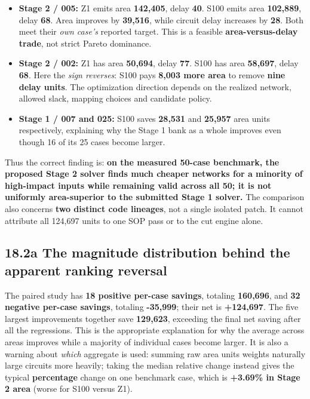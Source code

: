 \documentclass[a4paper,10pt]{article}
\providecommand{\tightlist}{\setlength{\itemsep}{0pt}\setlength{\parskip}{0pt}}
\theoremstyle{definition}
\theoremstyle{remark}
\begin{document}
\begin{itemize}
\tightlist
\item
  \textbf{Stage 2 / 005:} Z1 emits area \textbf{142,405}, delay \textbf{40}. S100 emits area \textbf{102,889}, delay \textbf{68}. Area improves by \textbf{39,516}, while circuit delay increases by \textbf{28}. Both meet their \emph{own case's} reported target. This is a feasible \textbf{area-versus-delay trade}, not strict Pareto dominance.
\item
  \textbf{Stage 2 / 002:} Z1 has area \textbf{50,694}, delay \textbf{77}. S100 has area \textbf{58,697}, delay \textbf{68}. Here the \emph{sign reverses}: S100 pays \textbf{8,003 more area} to remove \textbf{nine delay units}. The optimization direction depends on the realized network, allowed slack, mapping choices and candidate policy.
\item
  \textbf{Stage 1 / 007 and 025:} S100 saves \textbf{28,531} and \textbf{25,957} area units respectively, explaining why the Stage 1 bank as a whole improves even though 16 of its 25 cases become larger.
\end{itemize}

Thus the correct finding is: \textbf{on the measured 50-case benchmark, the proposed Stage 2 solver finds much cheaper networks for a minority of high-impact inputs while remaining valid across all 50; it is not uniformly area-superior to the submitted Stage 1 solver.} The comparison also concerns \textbf{two distinct code lineages}, not a single isolated patch. It cannot attribute all 124,697 units to one SOP pass or to the cut engine alone.

\subsection{18.2a The magnitude distribution behind the apparent ranking reversal}\label{a-the-magnitude-distribution-behind-the-apparent-ranking-reversal}

The paired study has \textbf{18 positive per-case savings}, totaling \textbf{160,696}, and \textbf{32 negative per-case savings}, totaling \textbf{-35,999}; their net is \textbf{+124,697}. The five largest improvements together save \textbf{129,623}, exceeding the final net saving after all the regressions. This is the appropriate explanation for why the average across areas improves while a majority of individual cases become larger. It is also a warning about \emph{which} aggregate is used: summing raw area units weights naturally large circuits more heavily; taking the median relative change instead gives the typical \textbf{percentage} change on one benchmark case, which is \textbf{+3.69\% in Stage 2 area} (worse for S100 versus Z1).
\end{document}
